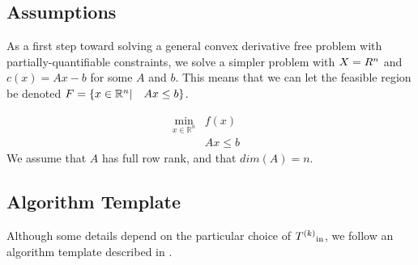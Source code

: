 \subsection{Assumptions}
% 
% 
% 
% 

As a first step toward solving a general convex derivative free problem with partially-quantifiable constraints,
we solve a simpler problem with $X = R^n$ and $c(x) = Ax-b$ for some $A$ and $b$.
This means that we can let the feasible region be denoted ${F} = \{x \in \mathbb R^n | \quad  Ax \le b \}$.

\[ \begin{array}{ccl} \min_{x \in \mathbb R^n} & f(x) \\
& Ax \le b & 
\end{array}
\]
We assume that $A$ has full row rank, and that  $dim(A) = n$.

\subsection{Algorithm Template}

Although some details depend on the particular choice of ${T^{(k)}}_{\text{in}}$, we follow an algorithm template described in \cite{doi:10.1080/10556788.2015.1026968}.



